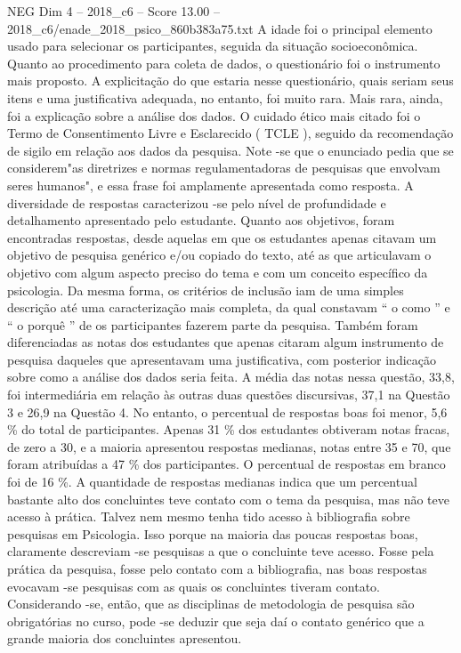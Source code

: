 \begin{textsample}{NEG Dim 4 – 2018\_c6 – Score 13.00 – 2018\_c6/enade\_2018\_psico\_860b383a75.txt}
A idade foi o principal elemento usado para selecionar os participantes, seguida da situação socioeconômica.
Quanto ao procedimento para coleta de dados, o questionário foi o instrumento mais proposto.
A explicitação do que estaria nesse questionário, quais seriam seus itens e uma justificativa adequada, no entanto, foi muito rara.
Mais rara, ainda, foi a explicação sobre a análise dos dados.
O cuidado ético mais citado foi o Termo de Consentimento Livre e Esclarecido ( TCLE ), seguido da recomendação de sigilo em relação aos dados da pesquisa.
Note -se que o enunciado pedia que se considerem"as diretrizes e normas regulamentadoras de pesquisas que envolvam seres humanos", e essa frase foi amplamente apresentada como resposta.
A diversidade de respostas caracterizou -se pelo nível de profundidade e detalhamento apresentado pelo estudante.
Quanto aos objetivos, foram encontradas respostas, desde aquelas em que os estudantes apenas citavam um objetivo de pesquisa genérico e/ou copiado do texto, até as que articulavam o objetivo com algum aspecto preciso do tema e com um conceito específico da psicologia.
Da mesma forma, os critérios de inclusão iam de uma simples descrição até uma caracterização mais completa, da qual constavam “ o como ” e “ o porquê ” de os participantes fazerem parte da pesquisa.
Também foram diferenciadas as notas dos estudantes que apenas citaram algum instrumento de pesquisa daqueles que apresentavam uma justificativa, com posterior indicação sobre como a análise dos dados seria feita.
A média das notas nessa questão, 33,8, foi intermediária em relação às outras duas questões discursivas, 37,1 na Questão 3 e 26,9 na Questão 4.
No entanto, o percentual de respostas boas foi menor, 5,6 \% do total de participantes.
Apenas 31 \% dos estudantes obtiveram notas fracas, de zero a 30, e a maioria apresentou respostas medianas, notas entre 35 e 70, que foram atribuídas a 47 \% dos participantes.
O percentual de respostas em branco foi de 16 \%.
A quantidade de respostas medianas indica que um percentual bastante alto dos concluintes teve contato com o tema da pesquisa, mas não teve acesso à prática.
Talvez nem mesmo tenha tido acesso à bibliografia sobre pesquisas em Psicologia.
Isso porque na maioria das poucas respostas boas, claramente descreviam -se pesquisas a que o concluinte teve acesso.
Fosse pela prática da pesquisa, fosse pelo contato com a bibliografia, nas boas respostas evocavam -se pesquisas com as quais os concluintes tiveram contato.
Considerando -se, então, que as disciplinas de metodologia de pesquisa são obrigatórias no curso, pode -se deduzir que seja daí o contato genérico que a grande maioria dos concluintes apresentou.

\end{textsample}
